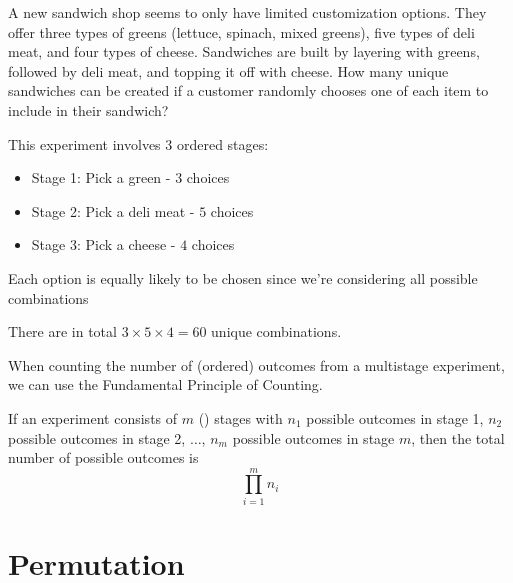 \begin{example}
    A new sandwich shop seems to only have limited customization options. They offer three types of greens (lettuce, spinach, mixed greens), five types of deli meat, and four types of cheese. Sandwiches are built by layering with greens, followed by deli meat, and topping it off with cheese. How many unique sandwiches can be created if a customer randomly chooses one of each item to include in their sandwich?

    This experiment involves $3$ ordered stages:
    \begin{itemize}
        \item Stage 1: Pick a green - $3$ choices
        \item Stage 2: Pick a deli meat - $5$ choices
        \item Stage 3: Pick a cheese - $4$ choices
    \end{itemize}

    Each option is equally likely to be chosen since we're considering all possible combinations

    There are in total $3 \times 5 \times 4 = 60$ unique combinations. 
\end{example}

When counting the number of (ordered) outcomes from a multistage experiment, we can use the Fundamental Principle of Counting.

\begin{theorem}
    If an experiment consists of $m$ () stages with $n_1$ possible outcomes in stage 1, $n_2$ possible outcomes in stage 2, $\dots$, $n_m$ possible outcomes in stage $m$, then the total number of possible outcomes is $$\prod_{i=1}^m n_i$$
\end{theorem}

\section{Permutation}

